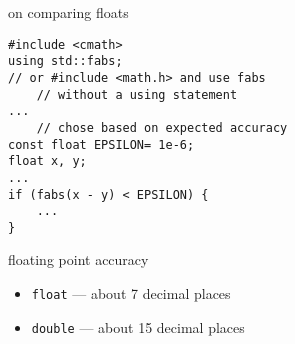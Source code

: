 \begin{frame}{on comparing floats}
\lstset{
    language=C++,
    style=small
}
\begin{lstlisting}
#include <cmath>
using std::fabs;
// or #include <math.h> and use fabs
    // without a using statement
...
    // chose based on expected accuracy
const float EPSILON= 1e-6; 
float x, y;
...
if (fabs(x - y) < EPSILON) {
    ...
}
\end{lstlisting}
\end{frame}

\begin{frame}[fragile,label=floatAcc]{floating point accuracy}
\lstset{
    language=C++,
    style=small
}
    \begin{itemize}
    \item \texttt{float} --- about 7 decimal places
    \item \texttt{double} --- about 15 decimal places
    \end{itemize}
\end{frame}
